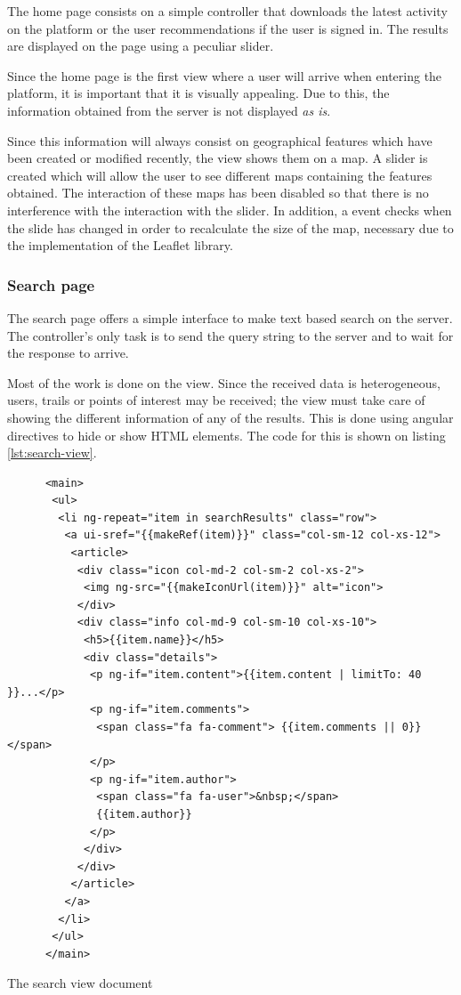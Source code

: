 The home page consists on a simple controller that downloads the latest activity on the platform or the user recommendations if the user is signed in. The results are displayed on the page using a peculiar slider.

Since the home page is the first view where a user will arrive when entering the platform, it is important that it is visually appealing. Due to this, the information obtained from the server is not displayed \textit{as is}. 

Since this information will always consist on geographical features which have been created or modified recently, the view shows them on a map. A slider is created which will allow the user to see different maps containing the features obtained. The interaction of these maps has been disabled so that there is no interference with the interaction with the slider. In addition, a event checks when the slide has changed in order to recalculate the size of the map, necessary due to the implementation of the Leaflet library.

\subsubsection*{Search page}

The search page offers a simple interface to make text based search on the server. The controller's only task is to send the query string to the server and to wait for the response to arrive.

Most of the work is done on the view. Since the received data is heterogeneous, users, trails or points of interest may be received; the view must take care of showing the different information of any of the results. This is done using angular directives to hide or show HTML elements. The code for this is shown on listing \ref{lst:search-view}.

\begin{listing}[ht]\centering
  \begin{minipage}{.85\textwidth}
    \begin{verbatim}
      <main>
       <ul>
        <li ng-repeat="item in searchResults" class="row">
         <a ui-sref="{{makeRef(item)}}" class="col-sm-12 col-xs-12">
          <article>
           <div class="icon col-md-2 col-sm-2 col-xs-2">
            <img ng-src="{{makeIconUrl(item)}}" alt="icon">
           </div>
           <div class="info col-md-9 col-sm-10 col-xs-10">
            <h5>{{item.name}}</h5>
            <div class="details">
             <p ng-if="item.content">{{item.content | limitTo: 40 }}...</p>
             <p ng-if="item.comments">
              <span class="fa fa-comment"> {{item.comments || 0}} </span>
             </p>
             <p ng-if="item.author">
              <span class="fa fa-user">&nbsp;</span> 
              {{item.author}} 
             </p>
            </div>
           </div>
          </article>
         </a>
        </li>
       </ul>
      </main>
    \end{verbatim}
  \end{minipage}
  \caption{The search view document}\label{lst:search-view}
\end{listing}

